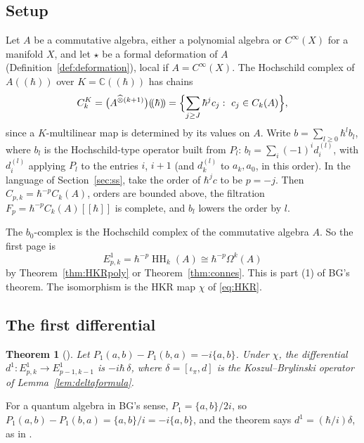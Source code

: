 \documentclass[11pt,oneside,reqno]{article}
\DeclareMathOperator{\HH}{HH}
\newcommand{\C}{\mathbb C}
\newcommand{\CI}{C^\infty}
\newcommand{\Om}{\Omega}
\newcommand{\hot}{\mathbin{\widehat\otimes}}
\newcommand{\hb}{\hbar}
\newcommand{\Lser}[1]{(\!(#1)\!)}
\theoremstyle{plain}
\newtheorem{theorem}{Theorem}[section]
\theoremstyle{definition}
\theoremstyle{remark}
\begin{document}
\subsection{Setup}\label{subsec:BG1setup}
Let \(A\) be a commutative algebra, either a polynomial algebra or \(\CI(X)\) for a
manifold \(X\), and let \(\star\) be a formal deformation of \(A\)
(Definition~\ref{def:deformation}), local if \(A=\CI(X)\). The Hochschild complex
of \(A\Lser{\hb}\) over \(K=\C\Lser{\hb}\) has chains
\[
 C^K_k=\bigl(A^{\hot(k+1)}\bigr)\Lser{\hb}=\Bigl\{\sum_{j\ge J}\hb^jc_j:\ c_j\in C_k(A)\Bigr\},
\]
since a \(K\)-multilinear map is determined by its values on \(A\). Write
\(b=\sum_{l\ge0}\hb^lb_l\), where \(b_l\) is the Hochschild-type operator built from
\(P_l\): \(b_l=\sum_i(-1)^id_i^{(l)}\), with \(d_i^{(l)}\) applying \(P_l\) to the entries
\(i\), \(i+1\) (and \(d_k^{(l)}\) to \(a_k,a_0\), in this order). In the language of
Section~\ref{sec:ss}, take the order of \(\hb^jc\) to be \(p=-j\). Then
\(C_{p,k}=\hb^{-p}C_k(A)\), orders are bounded above, the filtration
\(F_p=\hb^{-p}C_k(A)[[\hb]]\) is complete, and \(b_l\) lowers the order by \(l\).

The \(b_0\)-complex is the Hochschild complex of the commutative algebra \(A\).
So the first page is
\[
 E^1_{p,k}=\hb^{-p}\HH_k(A)\cong\hb^{-p}\Om^k(A)
\]
by Theorem~\ref{thm:HKRpoly} or Theorem~\ref{thm:connes}. This is part (1) of
BG's theorem. The isomorphism is the HKR map \(\chi\) of \eqref{eq:HKR}.

\subsection{The first differential}\label{subsec:d1}

\begin{theorem}[{\cite[\S1, Theorem]{BG}}]\label{thm:d1}
Let \(P_1(a,b)-P_1(b,a)=-i\{a,b\}\). Under \(\chi\), the differential
\(d^1:E^1_{p,k}\to E^1_{p-1,k-1}\) is \(-i\hb\,\delta\), where \(\delta=[\iota_\pi,d]\) is
the Koszul--Brylinski operator of Lemma~\ref{lem:deltaformula}.
\end{theorem}

For a quantum algebra in BG's sense, \(P_1=\{a,b\}/2i\), so
\(P_1(a,b)-P_1(b,a)=\{a,b\}/i=-i\{a,b\}\), and the theorem says \(d^1=(\hb/i)\delta\),
as in \cite{BG}.
\end{document}
